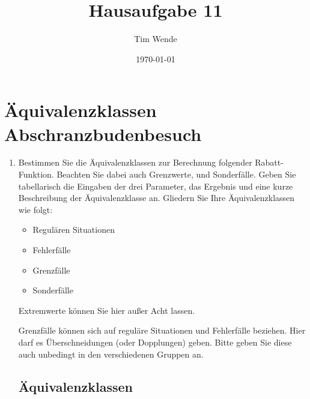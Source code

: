 \documentclass{article}
\author{Tim Wende}
\date{\today}
\title{\textbf{Hausaufgabe 11}}
\begin{document}
    \maketitle

    \section*{Äquivalenzklassen Abschranzbudenbesuch}

    \begin{enumerate}[label=\alph*.]
        \item Bestimmen Sie die Äquivalenzklassen zur Berechnung folgender Rabatt-Funktion.
            Beachten Sie dabei auch Grenzwerte, und Sonderfälle.
            Geben Sie tabellarisch die Eingaben der drei Parameter, das Ergebnis und eine kurze Beschreibung der Äquivalenzklasse an. 
            Gliedern Sie Ihre Äquivalenzklassen wie folgt:
            \begin{itemize}
                \item Regulären Situationen
                \item Fehlerfälle
                \item Grenzfälle
                \item Sonderfälle
            \end{itemize}
            Extremwerte können Sie hier außer Acht lassen.

            Grenzfälle können sich auf reguläre Situationen und Fehlerfälle beziehen. Hier darf es Überschneidungen (oder Dopplungen) geben. Bitte geben Sie diese auch unbedingt in den verschiedenen Gruppen an.

            \subsection*{Äquivalenzklassen}


\end{enumerate}
\end{document}
